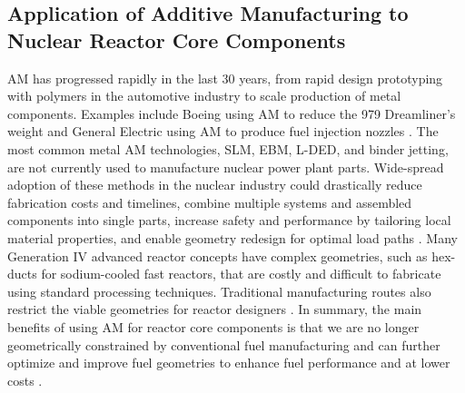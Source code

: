 \subsection{Application of Additive Manufacturing to Nuclear Reactor Core Components}
\label{sec:am}
\gls{AM} has progressed rapidly in the last 30 years, from rapid design prototyping 
with polymers in the automotive industry to scale production of metal components.  
Examples include Boeing using \gls{AM} to reduce the 979 Dreamliner's weight 
\cite{noauthor_printed_2017} and General Electric using \gls{AM} to produce fuel 
injection nozzles \cite{noauthor_transformation_2018}. 
The most common metal \gls{AM} technologies, \gls{SLM}, \gls{EBM}, \gls{L-DED}, 
and binder jetting, are not currently used to manufacture nuclear power plant parts. 
Wide-spread adoption of these methods in the nuclear industry could drastically 
reduce fabrication costs and timelines, combine multiple systems and assembled 
components into single parts, increase safety and performance by tailoring 
local material properties, and enable geometry redesign for optimal load paths 
\cite{simpson_considerations_2019}. 
Many Generation IV advanced reactor concepts have complex geometries, 
such as hex-ducts for sodium-cooled fast reactors, that are costly and difficult 
to fabricate using standard processing techniques. 
Traditional manufacturing routes also restrict the viable geometries for 
reactor designers \cite{sridharan_performance_2019}. 
In summary, the main benefits of using \gls{AM} for reactor core components is that 
we are no longer geometrically constrained by conventional fuel manufacturing 
and can further optimize and improve fuel geometries to enhance fuel performance and 
at lower costs \cite{bergeron_early_2018}. 

